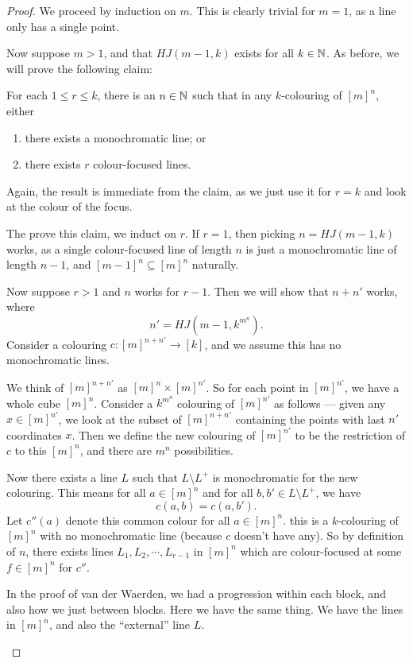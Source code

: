 \documentclass[a4paper]{article}
\begin{document}
\begin{proof}
  We proceed by induction on $m$. This is clearly trivial for $m = 1$, as a line only has a single point.

  Now suppose $m > 1$, and that $HJ(m - 1, k)$ exists for all $k \in \mathbb{N}$. As before, we will prove the following claim:
  \begin{claim}
    For each $1 \leq r \leq k$, there is an $n \in \mathbb{N}$ such that in any $k$-colouring of $[m]^n$, either
    \begin{enumerate}
      \item there exists a monochromatic line; or
      \item there exists $r$ colour-focused lines.
    \end{enumerate}
  \end{claim}
  Again, the result is immediate from the claim, as we just use it for $r = k$ and look at the colour of the focus.

  The prove this claim, we induct on $r$. If $r = 1$, then picking $n = HJ(m - 1, k)$ works, as a single colour-focused line of length $n$ is just a monochromatic line of length $n - 1$, and $[m - 1]^n \subseteq [m]^n$ naturally.

  Now suppose $r > 1$ and $n$ works for $r - 1$. Then we will show that $n + n'$ works, where
  \[
    n' = HJ(m - 1, k^{m^n}).
  \]
  Consider a colouring $c: [m]^{n + n'} \to [k]$, and we assume this has no monochromatic lines.

  We think of $[m]^{n + n'}$ as $[m]^n \times [m]^{n'}$. So for each point in $[m]^{n'}$, we have a whole cube $[m]^n$. Consider a $k^{m^n}$ colouring of $[m]^{n'}$ as follows --- given any $x \in [m]^{n'}$, we look at the subset of $[m]^{n + n'}$ containing the points with last $n'$ coordinates $x$. Then we define the new colouring of $[m]^{n'}$ to be the restriction of $c$ to this $[m]^n$, and there are $m^n$ possibilities.

  Now there exists a line $L$ such that $L \setminus L^+$ is monochromatic for the new colouring. This means for all $a \in [m]^n$ and for all $b, b' \in L\setminus L^+$, we have
  \[
    c(a, b) = c(a, b').
  \]
  Let $c''(a)$ denote this common colour for all $a \in [m]^n$. this is a $k$-colouring of $[m]^n$ with no monochromatic line (because $c$ doesn't have any). So by definition of $n$, there exists lines $L_1, L_2, \cdots, L_{r - 1}$ in $[m]^n$ which are colour-focused at some $f \in [m]^n$ for $c''$.

  In the proof of van der Waerden, we had a progression within each block, and also how we just between blocks. Here we have the same thing. We have the lines in $[m]^n$, and also the ``external'' line $L$.
  \begin{center}
\end{center}
\end{proof}
\end{document}
